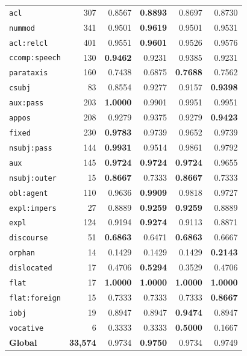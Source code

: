 \begin{table}[ht]
\begin{minipage}[t]{0.60\linewidth}
\begin{tabular}{l r  r r r r}
\texttt{acl} & 307 & 0.8567 & \textbf{0.8893} & 0.8697 & 0.8730 \\
\texttt{nummod} & 341 & 0.9501 & \textbf{0.9619} & 0.9501 & 0.9531 \\
\texttt{acl\!:\!relcl} & 401 & 0.9551 & \textbf{0.9601} & 0.9526 & 0.9576 \\
\texttt{ccomp\!:\!speech} & 130 & \textbf{0.9462} & 0.9231 & 0.9385 & 0.9231 \\
\texttt{parataxis} & 160 & 0.7438 & 0.6875 & \textbf{0.7688} & 0.7562 \\
\texttt{csubj} & 83 & 0.8554 & 0.9277 & 0.9157 & \textbf{0.9398} \\
\texttt{aux\!:\!pass} & 203 & \textbf{1.0000} & 0.9901 & 0.9951 & 0.9951 \\
\texttt{appos} & 208 & 0.9279 & 0.9375 & 0.9279 & \textbf{0.9423} \\
\texttt{fixed} & 230 & \textbf{0.9783} & 0.9739 & 0.9652 & 0.9739 \\
\texttt{nsubj\!:\!pass} & 144 & \textbf{0.9931} & 0.9514 & 0.9861 & 0.9792 \\
\texttt{aux} & 145 & \textbf{0.9724} & \textbf{0.9724} & \textbf{0.9724} & 0.9655 \\
\texttt{nsubj\!:\!outer} & 15 & \textbf{0.8667} & 0.7333 & \textbf{0.8667} & 0.7333 \\
\texttt{obl\!:\!agent} & 110 & 0.9636 & \textbf{0.9909} & 0.9818 & 0.9727 \\
\texttt{expl\!:\!impers} & 27 & 0.8889 & \textbf{0.9259} & \textbf{0.9259} & 0.8889 \\
\texttt{expl} & 124 & 0.9194 & \textbf{0.9274} & 0.9113 & 0.8871 \\
\texttt{discourse} & 51 & \textbf{0.6863} & 0.6471 & \textbf{0.6863} & 0.6667 \\
\texttt{orphan} & 14 & 0.1429 & 0.1429 & 0.1429 & \textbf{0.2143} \\
\texttt{dislocated} & 17 & 0.4706 & \textbf{0.5294} & 0.3529 & 0.4706 \\
\texttt{flat} & 17 & \textbf{1.0000} & \textbf{1.0000} & \textbf{1.0000} & \textbf{1.0000} \\
\texttt{flat\!:\!foreign} & 15 & 0.7333 & 0.7333 & 0.7333 & \textbf{0.8667} \\
\texttt{iobj} & 19 & 0.8947 & 0.8947 & \textbf{0.9474} & 0.8947 \\
\texttt{vocative} & 6 & 0.3333 & 0.3333 & \textbf{0.5000} & 0.1667 \\
\midrule
\textbf{Global} & \textbf{33,574} & 0.9734 & \textbf{0.9750} & 0.9734 & 0.9749 \\

\end{tabular}
\end{minipage}
\end{table}
